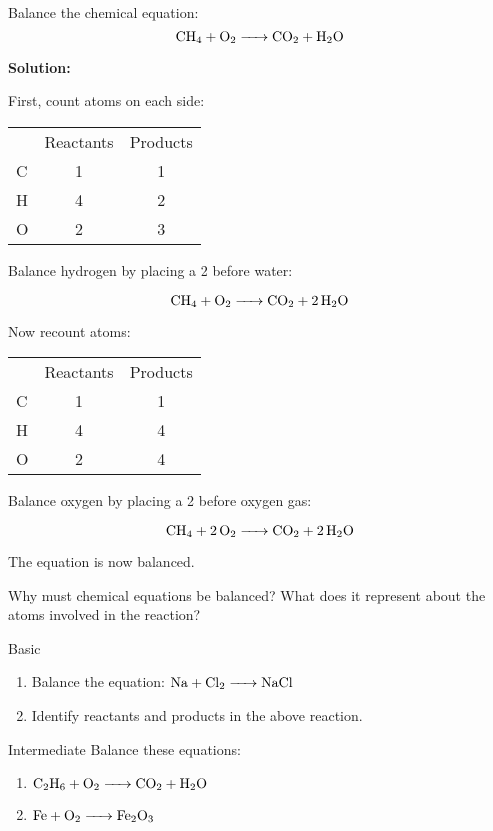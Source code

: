 \begin{example}
Balance the chemical equation:
\[
\ce{CH4 + O2 -> CO2 + H2O}
\]

\textbf{Solution:}

First, count atoms on each side:

\begin{tabular}{l c c}
 & Reactants & Products\\
C & 1 & 1 \\
H & 4 & 2 \\
O & 2 & 3 \\
\end{tabular}

Balance hydrogen by placing a 2 before water:

\[
\ce{CH4 + O2 -> CO2 + 2H2O}
\]

Now recount atoms:

\begin{tabular}{l c c}
 & Reactants & Products\\
C & 1 & 1 \\
H & 4 & 4 \\
O & 2 & 4 \\
\end{tabular}

Balance oxygen by placing a 2 before oxygen gas:

\[
\ce{CH4 + 2O2 -> CO2 + 2H2O}
\]

The equation is now balanced.
\end{example}

\begin{stopandthink}
Why must chemical equations be balanced? What does it represent about the atoms involved in the reaction?
\end{stopandthink}

\begin{tieredquestions}{Basic}
\begin{enumerate}
    \item Balance the equation: \(\ce{Na + Cl2 -> NaCl}\)
    \item Identify reactants and products in the above reaction.
\end{enumerate}
\end{tieredquestions}

\begin{tieredquestions}{Intermediate}
Balance these equations:
\begin{enumerate}
    \item \(\ce{C2H6 + O2 -> CO2 + H2O}\)
    \item \(\ce{Fe + O2 -> Fe2O3}\)
\end{enumerate}
\end{tieredquestions}

